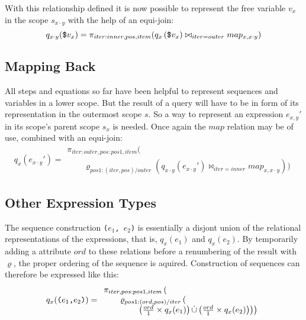 With this relationship defined it is now possible to represent the free variable $v_{x}$ in the scope $s_{x \cdot
y}$ with the help of an equi-join:
\begin{equation}
q_{x \cdot y}(\mbox{\texttt{\$}}v_{x}) = \pi_{iter:inner, pos,
item}(q_{x}\left(\mbox{\texttt{\$}}v_{x})\bowtie_{iter=outer} map_{x, x \cdot y}\right)
\label{eq:ll:qxy_vx}
\end{equation}

\subsection{Mapping Back}
\label{sect:trans:ll:mappingBack}

All steps and equations so far have been helpful to represent sequences and variables in a lower scope. But the
result of a query will have to be in form of its representation in the outermost scope $s$. So a way to represent
an expression $e_{x,y}'$ in its scope's parent scope $s_{x}$ is needed. Once again the $map$ relation may be of
use, combined with an equi-join:
\begin{equation}
q_{x}(e_{x \cdot y}') =
\begin{array}{l}
 \pi_{iter:outer, pos:pos1, item}(\\ \qquad\varrho_{pos1:(iter,pos)/outer}(q_{x \cdot
y}(e_{x \cdot y}')\bowtie_{iter = inner}map_{x, x \cdot y}))
\end{array}
\label{eq:ll:qx_exymark}
\end{equation}


\subsection{Other Expression Types}
\label{sect:trans:ll:OtherExpr}

The sequence construction \texttt{(}$e_{1}$\texttt{, }$e_{2}$\texttt{)} is essentially a disjont union of the
relational representations of the expressions, that is, $q_{x}(e_{1})$ and $q_{x}(e_{2})$. By temporarily adding a
attribute $ord$ to these relations before a renumbering of the result with $\varrho$, the proper ordering of the
sequence is aquired. Construction of sequences can therefore be expressed like this:
\begin{equation}
q_{x}(\mbox{\texttt{(}}e_{1}\mbox{\texttt{,}}e_{2}\mbox{\texttt{)}})=
\begin{array}{l}


\pi_{iter,pos:pos1,item}
\left( \right.\\ \qquad

\varrho_{pos1:(ord,pos)/iter}
	\left( \right. \\ \qquad \qquad
	\left. \left.
		\left(
		\frac{ord}{1} \times q_{x}(e_{1})
		\right)
		\dot\cup
		\left(
		\frac{ord}{1} \times q_{x}(e_{2})
		\right)		
	\right)
\right)
\end{array}
\label{eq:ll:secuence}
\end{equation}

